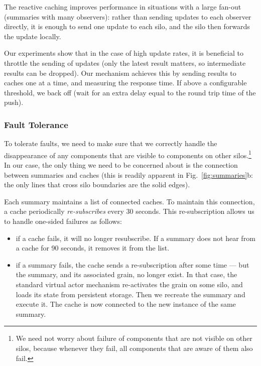  The reactive caching improves performance in situations with a large fan-out (summaries with many observers): rather than sending updates to each observer directly, it is enough to send one update to each silo, and the silo then forwards the update locally.

Our experiments show that in the case of high update rates, it is beneficial to throttle the sending of updates (only the latest result matters, so intermediate results can be dropped). Our mechanism achieves this by sending results to caches one at a time, and measuring the response time. If above a configurable threshold, we back off (wait for an extra delay equal to the round trip time of the push). 

\subsubsection{Fault Tolerance}\label{sec:ft}

To tolerate faults, we need to make sure that we correctly handle the disappearance of any components that are visible to components on other silos.\footnote{We need not worry about failure of components that are not visible on other silos, because whenever they fail, all components that are aware of them also fail.} In our case, the only thing we need to be concerned about is the connection between summaries and caches (this is readily apparent in Fig.~\ref{fig:summaries}b: the only lines that cross silo boundaries are the solid edges).

Each summary maintains a list of connected caches. To maintain this connection, a cache periodically \emph{re-subscribes} every 30 seconds. This re-subscription allows us to handle one-sided failures as follows:
\begin{itemize}
\item if a cache fails, it will no longer resubscribe. If a summary does not hear from a cache for 90 seconds, it removes it from the list. 
\item if a summary fails, the cache sends a re-subscription after some time --- but the summary, and its associated grain, no longer exist. In that case, the standard virtual actor mechanism re-activates the grain on some silo, and loads its state from persistent storage. Then we recreate the summary and execute it. The cache is now connected to the new instance of the same summary. 
\end{itemize}
